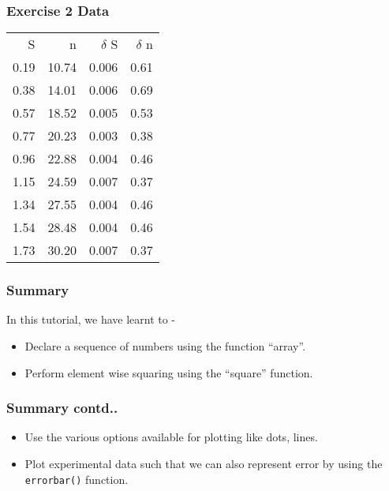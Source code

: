 \documentclass[17pt,compress]{beamer}
\begin{document}
\begin{frame}
\frametitle{Exercise 2 Data}
\label{sec-7}

\begin{center}
\begin{small}
\begin{tabular}{rrrr}

    S  &      n  &  $\delta$ S  &  $\delta$ n  \\
 0.19  &  10.74  &       0.006  &        0.61  \\
 0.38  &  14.01  &       0.006  &        0.69  \\
 0.57  &  18.52  &       0.005  &        0.53  \\
 0.77  &  20.23  &       0.003  &        0.38  \\
 0.96  &  22.88  &       0.004  &        0.46  \\
 1.15  &  24.59  &       0.007  &        0.37  \\
 1.34  &  27.55  &       0.004  &        0.46  \\
 1.54  &  28.48  &       0.004  &        0.46  \\
 1.73  &  30.20  &       0.007  &        0.37  \\

\end{tabular}
\end{small}
\end{center}
\end{frame}
\begin{frame}
\frametitle{Summary}
\label{sec-8}

  In this tutorial, we have learnt to -

\begin{itemize}
\item Declare a sequence of numbers using the function ``array''.
\item Perform element wise squaring using the ``square'' function.
\end{itemize}
\end{frame}
\begin{frame}
\frametitle{Summary contd..}
\label{sec-8.1}
\begin{itemize}
\item Use the various options available for plotting like dots, lines.
\item Plot experimental data such that we can also represent error by using the \texttt{errorbar()} function.
\end{itemize}
\end{frame}
\end{document}
